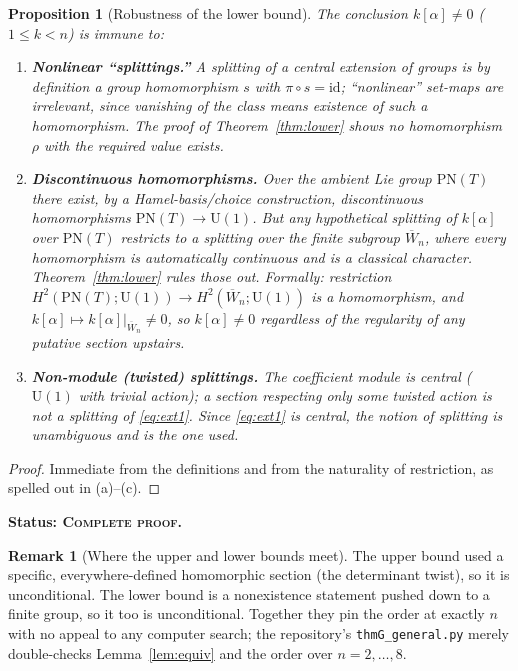\documentclass[11pt]{article}
\newtheorem{proposition}[theorem]{Proposition}
\theoremstyle{definition}
\newtheorem{remark}[theorem]{Remark}
\newcommand{\U}{\mathrm{U}}
\newcommand{\PN}{\mathrm{PN}}
\newcommand{\id}{\mathrm{id}}
\newcommand{\Wn}{\overline{W}_{n}}
\newcommand{\STAT}[1]{\noindent\textbf{Status: #1}}
\newcommand{\COMPLETE}{\textsc{Complete proof}}
\begin{document}
\begin{proposition}[Robustness of the lower bound]\label{prop:robust}
The conclusion $k[\alpha]\neq0$ ($1\le k<n$) is immune to:
\begin{enumerate}
\item[(a)] \textbf{Nonlinear ``splittings.''} A splitting of a central extension of groups
is by definition a group homomorphism $s$ with $\pi\circ s=\id$; ``nonlinear'' set-maps are
irrelevant, since vanishing of the class \emph{means} existence of such a homomorphism. The
proof of Theorem~\ref{thm:lower} shows no \emph{homomorphism} $\rho$ with the required value
exists.
\item[(b)] \textbf{Discontinuous homomorphisms.} Over the ambient Lie group $\PN(T)$ there
exist, by a Hamel-basis/choice construction, discontinuous homomorphisms $\PN(T)\to\U(1)$.
But any hypothetical splitting of $k[\alpha]$ over $\PN(T)$ restricts to a splitting over the
\emph{finite} subgroup $\Wn$, where every homomorphism is automatically continuous and is a
classical character. Theorem~\ref{thm:lower} rules those out. Formally: restriction
$H^2(\PN(T);\U(1))\to H^2(\Wn;\U(1))$ is a homomorphism, and $k[\alpha]\mapsto k[\alpha]
|_{\Wn}\neq0$, so $k[\alpha]\neq0$ regardless of the regularity of any putative section
upstairs.
\item[(c)] \textbf{Non-module (twisted) splittings.} The coefficient module is
\emph{central} ($\U(1)$ with trivial action); a section respecting only some twisted action
is not a splitting of \eqref{eq:ext1}. Since \eqref{eq:ext1} is central, the notion of
splitting is unambiguous and is the one used.
\end{enumerate}
\end{proposition}
\begin{proof}
Immediate from the definitions and from the naturality of restriction, as spelled out in
(a)--(c).
\end{proof}
\STAT{\COMPLETE.}

\begin{remark}[Where the upper and lower bounds meet]
The upper bound used a specific, everywhere-defined homomorphic section (the determinant
twist), so it is unconditional. The lower bound is a nonexistence statement pushed down to a
finite group, so it too is unconditional. Together they pin the order at exactly $n$ with no
appeal to any computer search; the repository's \texttt{thmG\_general.py} merely
double-checks Lemma~\ref{lem:equiv} and the order over $n=2,\dots,8$.
\end{remark}
\end{document}
